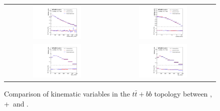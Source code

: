 \begin{figure}[p]
\begin{center}
\begin{tabular}{cc}
\includegraphics[width=0.48\textwidth]{Modeling/Figures/default_tt2bq_q1_pt_norm} &
\includegraphics[width=0.48\textwidth]{Modeling/Figures/default_tt2bq_q1_eta_norm} \\
\includegraphics[width=0.48\textwidth]{Modeling/Figures/default_tt2bq_top_pt_norm} &
\includegraphics[width=0.48\textwidth]{Modeling/Figures/default_tt2bq_ttbar_pt_norm} \\
\end{tabular}
\caption{Comparison of kinematic variables in the $t\bar{t}+bb$ topology between \PP, \madgraph+\pythia\ and \ShOL.}
\label{fig:default_tt2b}
\end{center}
\end{figure}
